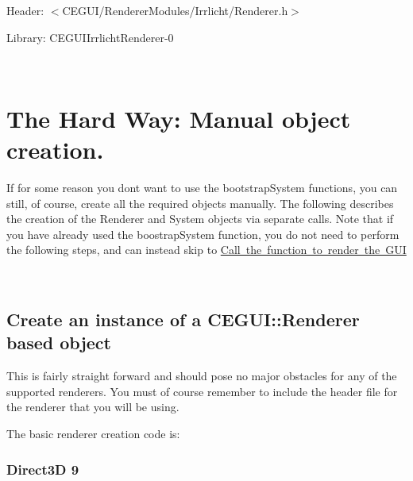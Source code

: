\begin{DoxyItemize}
\item Header\+: $<$C\+E\+G\+U\+I/\+Renderer\+Modules/\+Irrlicht/\+Renderer.\+h$>$
\item Library\+: C\+E\+G\+U\+I\+Irrlicht\+Renderer-\/0 
\begin{DoxyCode}{0}
\DoxyCodeLine{\textcolor{comment}{// Bootstrap CEGUI::System with an IrrlichtRenderer object, an Irrlicht based}}
\DoxyCodeLine{\textcolor{comment}{// ResourceProvider, and an Irrlicht based ImageCodec.}}
\end{DoxyCode}

\end{DoxyItemize}

~\newline
 \hypertarget{rendering_tutorial_rendering_tutorial_nonbootstrap}{}\section{The Hard Way\+: Manual object creation.}\label{rendering_tutorial_rendering_tutorial_nonbootstrap}
If for some reason you don\textquotesingle{}t want to use the bootstrap\+System functions, you can still, of course, create all the required objects manually. The following describes the creation of the Renderer and System objects via separate calls. Note that if you have already used the boostrap\+System function, you do not need to perform the following steps, and can instead skip to \mbox{\hyperlink{rendering_tutorial_rendering_tutorial_draw}{Call the function to render the G\+UI}}

~\newline
 \hypertarget{rendering_tutorial_rendering_tutorial_renderer}{}\subsection{Create an instance of a C\+E\+G\+U\+I\+::\+Renderer based object}\label{rendering_tutorial_rendering_tutorial_renderer}
This is fairly straight forward and should pose no major obstacles for any of the supported renderers. You must of course remember to include the header file for the renderer that you will be using.

The basic renderer creation code is\+: \hypertarget{rendering_tutorial_rendering_tutorial_renderer_d3d9}{}\subsubsection{Direct3\+D 9}\label{rendering_tutorial_rendering_tutorial_renderer_d3d9}

